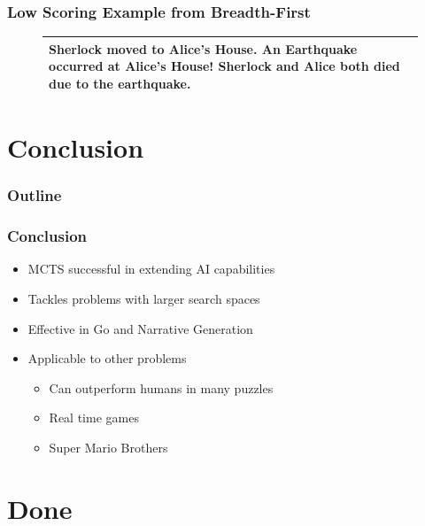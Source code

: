 \documentclass{beamer}
\begin{document}
\begin{frame}[fragile]
\frametitle{Low Scoring Example from Breadth-First}
\begin{figure}[h]
\begin{tabular}{|p{10cm}|}
\hline
Sherlock moved to Alice's House. An Earthquake occurred at Alice's House! Sherlock and Alice both died due to the earthquake. \\ \hline
\end{tabular}
\centering
\label{fig:BadStory}
\end{figure}
\end{frame}

\section{Conclusion}

\begin{frame}
\frametitle{Outline}
\tableofcontents[currentsection]
\end{frame}

\begin{frame}
\frametitle{Conclusion}
\begin{itemize}
	\item MCTS successful in extending AI capabilities
	\item Tackles problems with larger search spaces
	\item Effective in Go and Narrative Generation
	\item Applicable to other problems
	\begin{itemize}
		\item Can outperform humans in many puzzles
		\item Real time games
		\item Super Mario Brothers
	\end{itemize}
\end{itemize}
\end{frame}

\section{Done}
 
\end{document}
